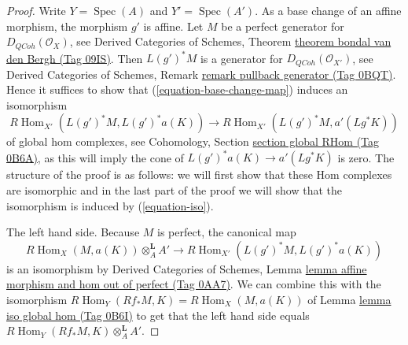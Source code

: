 \documentclass{amsart}
\theoremstyle{plain}
\theoremstyle{definition}
\theoremstyle{remark}
\numberwithin{equation}{subsection}
\def\Spec{\mathop{\mathrm{Spec}}}
\def\Hom{\mathop{\mathrm{Hom}}\nolimits}
\def\QCoh{\mathit{QCoh}}
\begin{document}
\begin{proof}
Write $Y = \Spec(A)$ and $Y' = \Spec(A')$. As a base change of an affine
morphism, the morphism $g'$ is affine. Let $M$ be a perfect generator
for $D_\QCoh(\mathcal{O}_X)$, see Derived Categories of Schemes, Theorem
\href{https://stacks.math.columbia.edu/tag/09IS}{theorem bondal van den Bergh (Tag 09IS)}. Then $L(g')^*M$ is a
generator for $D_\QCoh(\mathcal{O}_{X'})$, see
Derived Categories of Schemes, Remark \href{https://stacks.math.columbia.edu/tag/0BQT}{remark pullback generator (Tag 0BQT)}.
Hence it suffices to show that (\ref{equation-base-change-map})
induces an isomorphism
\begin{equation}
\label{equation-iso}
R\Hom_{X'}(L(g')^*M, L(g')^*a(K))
\longrightarrow
R\Hom_{X'}(L(g')^*M, a'(Lg^*K))
\end{equation}
of global hom complexes, see
Cohomology, Section \href{https://stacks.math.columbia.edu/tag/0B6A}{section global RHom (Tag 0B6A)},
as this will imply the cone of $L(g')^*a(K) \to a'(Lg^*K)$
is zero.
The structure of the proof is as follows: we will first show that
these Hom complexes are isomorphic and in the last part of the proof
we will show that the isomorphism is induced by (\ref{equation-iso}).

\medskip\noindent
The left hand side. Because $M$ is perfect, the canonical map
$$
R\Hom_X(M, a(K)) \otimes^\mathbf{L}_A A'
\longrightarrow
R\Hom_{X'}(L(g')^*M, L(g')^*a(K))
$$
is an isomorphism by Derived Categories of Schemes, Lemma
\href{https://stacks.math.columbia.edu/tag/0AA7}{lemma affine morphism and hom out of perfect (Tag 0AA7)}.
We can combine this with the isomorphism
$R\Hom_Y(Rf_*M, K) = R\Hom_X(M, a(K))$
of Lemma \href{https://stacks.math.columbia.edu/tag/0B6I}{lemma iso global hom (Tag 0B6I)}
to get that the left hand side equals
$R\Hom_Y(Rf_*M, K) \otimes^\mathbf{L}_A A'$.


\end{proof}
\end{document}
